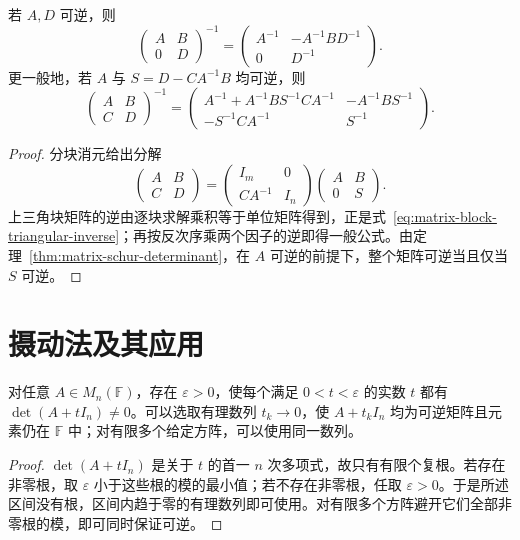 \begin{proposition}
\label{prop:matrix-block-inverse}
若 $A,D$ 可逆，则
\begin{equation}
 \begin{pmatrix}A&B\\0&D\end{pmatrix}^{-1}
 =\begin{pmatrix}A^{-1}&-A^{-1}BD^{-1}\\0&D^{-1}\end{pmatrix}.
 \label{eq:matrix-block-triangular-inverse}
\end{equation}
更一般地，若 $A$ 与 $S=D-CA^{-1}B$ 均可逆，则
\begin{equation}
 \begin{pmatrix}A&B\\C&D\end{pmatrix}^{-1}
 =\begin{pmatrix}
 A^{-1}+A^{-1}BS^{-1}CA^{-1}&-A^{-1}BS^{-1}\\
 -S^{-1}CA^{-1}&S^{-1}
 \end{pmatrix}.
 \label{eq:matrix-schur-inverse}
\end{equation}
\end{proposition}
\begin{proof}
分块消元给出分解
\[
 \begin{pmatrix}A&B\\C&D\end{pmatrix}
 =\begin{pmatrix}I_m&0\\CA^{-1}&I_n\end{pmatrix}
 \begin{pmatrix}A&B\\0&S\end{pmatrix}.
\]
上三角块矩阵的逆由逐块求解乘积等于单位矩阵得到，正是式~\eqref{eq:matrix-block-triangular-inverse}；再按反次序乘两个因子的逆即得一般公式。由定理~\ref{thm:matrix-schur-determinant}，在 $A$ 可逆的前提下，整个矩阵可逆当且仅当 $S$ 可逆。
\end{proof}

\section{摄动法及其应用}
\label{sec:matrix-perturbation}

\begin{lemma}
\label{lem:matrix-perturbation}
对任意 $A\in M_n(\mathbb F)$，存在 $\varepsilon>0$，使每个满足 $0<t<\varepsilon$ 的实数 $t$ 都有 $\det(A+tI_n)\ne0$。可以选取有理数列 $t_k\to0$，使 $A+t_kI_n$ 均为可逆矩阵且元素仍在 $\mathbb F$ 中；对有限多个给定方阵，可以使用同一数列。
\end{lemma}
\begin{proof}
$\det(A+tI_n)$ 是关于 $t$ 的首一 $n$ 次多项式，故只有有限个复根。若存在非零根，取 $\varepsilon$ 小于这些根的模的最小值；若不存在非零根，任取 $\varepsilon>0$。于是所述区间没有根，区间内趋于零的有理数列即可使用。对有限多个方阵避开它们全部非零根的模，即可同时保证可逆。
\end{proof}

